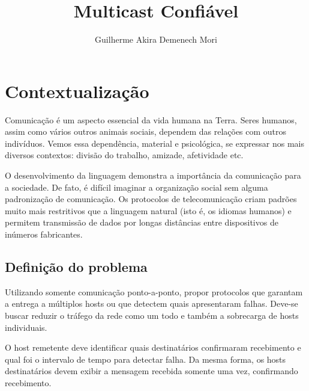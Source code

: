 \documentclass[12pt,twocolumn]{article}
\title{Multicast Confiável}
\author{Guilherme Akira Demenech Mori}
\begin{document}
	
	
	
		
		\maketitle	
	
		\begin{abstract}
			
		\end{abstract}
	
		\tableofcontents
		
		\listoffigures
	

	
		\section*{Contextualização}
			Comunicação é um aspecto essencial da vida humana na Terra.
			Seres humanos, assim como vários outros animais sociais, dependem das relações com outros indivíduos.
			Vemos essa dependência, material e psicológica, se expressar nos mais diversos contextos: divisão do trabalho, amizade, afetividade etc.  
			
			O desenvolvimento da linguagem demonstra a importância da comunicação para a sociedade.
			De fato, é difícil imaginar a organização social sem alguma padronização de comunicação.
			Os protocolos de telecomunicação criam padrões muito mais restritivos que a linguagem natural (isto é, os idiomas humanos) e permitem transmissão de dados por longas distâncias entre dispositivos de inúmeros fabricantes.						  
	
			\subsection{Definição do problema}
				Utilizando somente comunicação ponto-a-ponto, propor protocolos que garantam a entrega a múltiplos hosts ou que detectem quais apresentaram falhas.  		
				Deve-se buscar reduzir o tráfego da rede como um todo e também a sobrecarga de hosts individuais.
				
				O host remetente deve identificar quais destinatários confirmaram recebimento e qual foi o intervalo de tempo para detectar falha. 
				Da mesma forma, os hosts destinatários devem exibir a mensagem recebida somente uma vez, confirmando recebimento.
				
\end{document}
